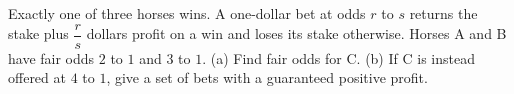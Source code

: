 Exactly one of three horses wins. A one-dollar bet at odds $r$ to $s$ returns the stake plus $\dfrac{r}{s}$ dollars profit on a win and loses its stake otherwise. Horses A and B have fair odds $2$ to $1$ and $3$ to $1$. (a) Find fair odds for C. (b) If C is instead offered at $4$ to $1$, give a set of bets with a guaranteed positive profit.
